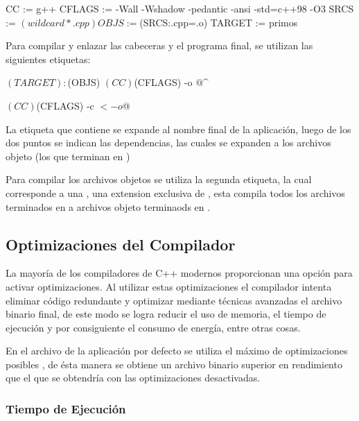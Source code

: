 \documentclass[12pt]{article}
\newenvironment{fullgrayverb}
{\verbbox}
{\endverbbox\par\colorbox{gray!25}{\parbox{\textwidth}{\theverbbox}}\par}
\begin{document}
\begin{fullgrayverb}[\mbox{}]
CC := g++
CFLAGS := -Wall -Wshadow -pedantic -ansi -std=c++98 -O3
SRCS := $(wildcard *.cpp)
OBJS := $(SRCS:.cpp=.o)
TARGET := primos
\end{fullgrayverb}

Para compilar y enlazar las cabeceras y el programa final, se utilizan las
siguientes etiquetas:

\begin{fullgrayverb}[\mbox{}]
$(TARGET): $(OBJS)
    $(CC) $(CFLAGS) -o $@ $^

    $(CC) $(CFLAGS) -c $< -o $@
\end{fullgrayverb}

La etiqueta que contiene  se expande al nombre final de la
aplicación, luego de los dos puntos se indican las dependencias, las cuales se
expanden a los archivos objeto (los que terminan en )

Para compilar los archivos objetos se utiliza la segunda etiqueta, la cual
corresponde a una , una extension exclusiva de , 
esta  compila todos los archivos terminados en  a
archivos objeto terminaods en .

\subsection{Optimizaciones del Compilador}

La mayoría de los compiladores de C++ modernos proporcionan una opción para
activar optimizaciones. Al utilizar estas optimizaciones el compilador
intenta eliminar código redundante y optimizar mediante técnicas avanzadas el
archivo binario final, de este modo se logra reducir el uso de memoria, el
tiempo de ejecución y por consiguiente el consumo de energía, entre otras cosas.

En el archivo  de la aplicación por defecto se utiliza el máximo
de optimizaciones posibles , de ésta manera se obtiene un archivo
binario superior en rendimiento que el que se obtendría con las optimizaciones
desactivadas.


\subsubsection{Tiempo de Ejecución}
\end{document}
